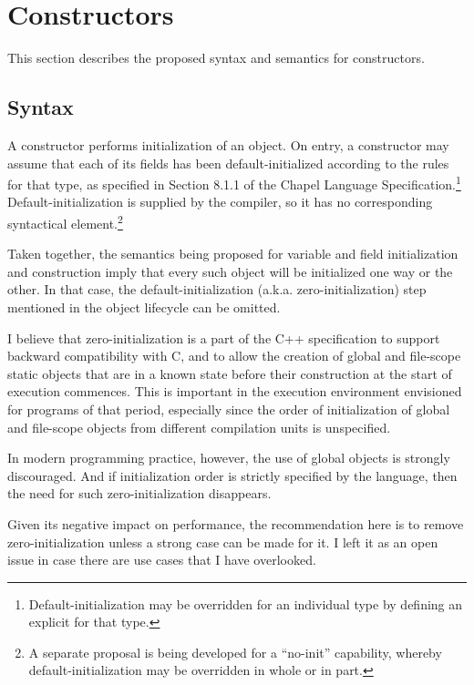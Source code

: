 \section{Constructors}
\label{Constructors}

This section describes the proposed syntax and semantics for constructors.

\subsection{Syntax}
\label{Constructors_Syntax}

A constructor performs initialization of an object.  On entry, a
constructor may assume that each of its fields has been default-initialized according to the
rules for that type, as specified in Section 8.1.1 of the Chapel Language
Specification.\footnote{Default-initialization may be overridden for an individual type by
  defining an explicit  for that type.}
Default-initialization is supplied by the compiler, so it has no corresponding syntactical
element.\footnote{A separate proposal is being developed for a ``no-init'' capability,
  whereby default-initialization may be overridden in whole or in part.}

\begin{openissue}
Taken together, the semantics being proposed for variable and field initialization and
construction imply that every such object will be initialized one way or the other.  In
that case, the default-initialization (a.k.a. zero-initialization) step mentioned in the
object lifecycle can be omitted.

I believe that zero-initialization is a part of the C++ specification to support backward
compatibility with C, and to allow the creation of global and file-scope static objects
that are in a known state before their construction at the start of execution commences.
This is important in the execution environment envisioned for programs of that period,
especially since the order of initialization of global and file-scope objects from
different compilation units is unspecified.

In modern programming practice, however, the use of global objects is strongly
discouraged.  And if initialization order is strictly specified by the language, then the
need for such zero-initialization disappears.  

Given its negative impact on performance, the recommendation here is to remove
zero-initialization unless a strong case can be made for it.  I left it as an open
issue in case there are use cases that I have overlooked.
\end{openissue}


